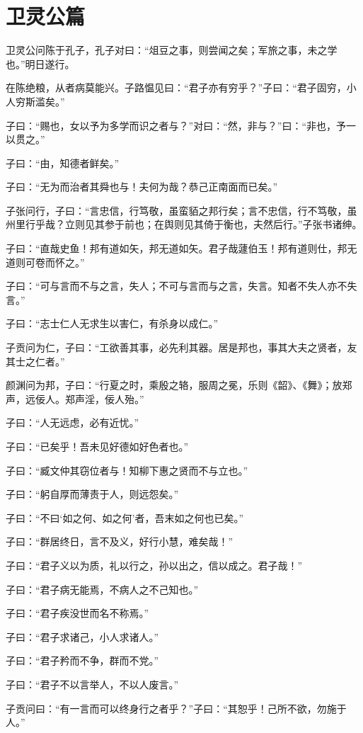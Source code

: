 \documentclass[12pt,a4paper]{ctexbook}
\begin{document}
\section{卫灵公篇}
卫灵公问陈于孔子，孔子对曰：“俎豆之事，则尝闻之矣；军旅之事，未之学也。”明日遂行。\par
在陈绝粮，从者病莫能兴。子路愠见曰：“君子亦有穷乎？”子曰：“君子固穷，小人穷斯滥矣。”\par
子曰：“赐也，女以予为多学而识之者与？”对曰：“然，非与？”曰：“非也，予一以贯之。”\par
子曰：“由，知德者鲜矣。”\par
子曰：“无为而治者其舜也与！夫何为哉？恭己正南面而已矣。”\par
子张问行，子曰：“言忠信，行笃敬，虽蛮貊之邦行矣；言不忠信，行不笃敬，虽州里行乎哉？立则见其参于前也；在舆则见其倚于衡也，夫然后行。”子张书诸绅。\par
子曰：“直哉史鱼！邦有道如矢，邦无道如矢。君子哉蘧伯玉！邦有道则仕，邦无道则可卷而怀之。”\par
子曰：“可与言而不与之言，失人；不可与言而与之言，失言。知者不失人亦不失言。”\par
子曰：“志士仁人无求生以害仁，有杀身以成仁。”\par
子贡问为仁，子曰：“工欲善其事，必先利其器。居是邦也，事其大夫之贤者，友其士之仁者。”\par
颜渊问为邦，子曰：“行夏之时，乘殷之辂，服周之冕，乐则《韶》、《舞》；放郑声，远佞人。郑声淫，佞人殆。”\par
子曰：“人无远虑，必有近忧。”\par
子曰：“已矣乎！吾未见好德如好色者也。”\par
子曰：“臧文仲其窃位者与！知柳下惠之贤而不与立也。”\par
子曰：“躬自厚而薄责于人，则远怨矣。”\par
子曰：“不曰‘如之何、如之何’者，吾末如之何也已矣。”\par
子曰：“群居终日，言不及义，好行小慧，难矣哉！”\par
子曰：“君子义以为质，礼以行之，孙以出之，信以成之。君子哉！”\par
子曰：“君子病无能焉，不病人之不己知也。”\par
子曰：“君子疾没世而名不称焉。”\par
子曰：“君子求诸己，小人求诸人。”\par
子曰：“君子矜而不争，群而不党。”\par
子曰：“君子不以言举人，不以人废言。”\par
子贡问曰：“有一言而可以终身行之者乎？”子曰：“其恕乎！己所不欲，勿施于人。”\par
\end{document}
